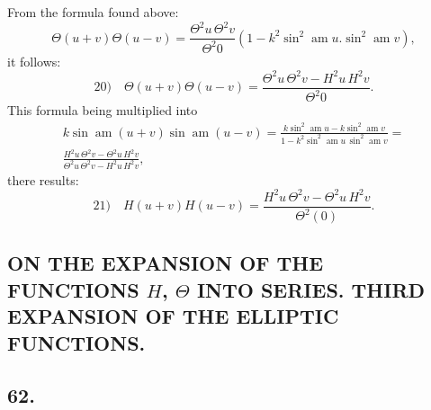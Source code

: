 \documentclass{article}
\begin{document}
From the formula found above:
\[
\Theta(u+v)\Theta(u-v)=\frac{\Theta^{2}u\,\Theta^{2}v}{\Theta^{2}0}\left(1-k^{2}\sin^{2}\operatorname{am}u.\sin^{2}\operatorname{am}v\right),
\]
it follows:
\[
\text{20)}\quad\Theta(u+v)\Theta(u-v)=\frac{\Theta^{2}u\,\Theta^{2}v-H^{2}u\,H^{2}v}{\Theta^{2}0}.
\]
This formula being multiplied into
\[
\begin{gathered}
k\sin\operatorname{am}(u+v)\sin\operatorname{am}(u-v)=\frac{k\sin^{2}\operatorname{am}u-k\sin^{2}\operatorname{am}v}{1-k^{2}\sin^{2}\operatorname{am}u\,\sin^{2}\operatorname{am}v}=\\[1.5ex]
\frac{H^{2}u\,\Theta^{2}v-\Theta^{2}u\,H^{2}v}{\Theta^{2}u\,\Theta^{2}v-H^{2}u\,H^{2}v},
\end{gathered}
\]
there results:
\[
\text{21)}\quad H(u+v)H(u-v)=\frac{H^{2}u\,\Theta^{2}v-\Theta^{2}u\,H^{2}v}{\Theta^{2}(0)}.
\]

\subsection*{ON THE EXPANSION OF THE FUNCTIONS $H$, $\Theta$ INTO SERIES. THIRD EXPANSION OF THE ELLIPTIC FUNCTIONS.}

\subsection*{62.}
\end{document}
